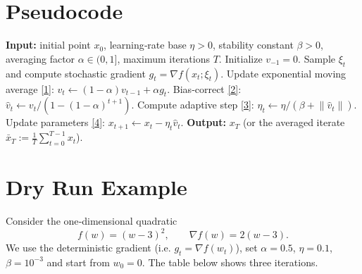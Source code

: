 \documentclass{article}
\newcommand{\norm}[1]{\left\|#1\right\|}
\newcommand{\grad}{\nabla}
\begin{document}
\section*{Pseudocode}
\begin{algorithm}[H]
\caption{Adaptive Variance‑Reduced Gradient (AVRG)}
\begin{algorithmic}[1]
\State \textbf{Input:} initial point $x_0$, learning‑rate base $\eta>0$, 
stability constant $\beta>0$, averaging factor $\alpha\in(0,1]$, 
maximum iterations $T$.
\State Initialize $v_{-1}=0$.
    \State Sample $\xi_t$ and compute stochastic gradient $g_t=\grad f(x_t;\xi_t)$.
    \State Update exponential moving average \eqref{1}:
          $v_t\gets (1-\alpha)v_{t-1}+ \alpha g_t$.
    \State Bias‑correct \eqref{2}:
          $\hat v_t\gets v_t/(1-(1-\alpha)^{t+1})$.
    \State Compute adaptive step \eqref{3}:
          $\eta_t\gets \eta/(\beta+\norm{\hat v_t})$.
    \State Update parameters \eqref{4}:
          $x_{t+1}\gets x_t-\eta_t\hat v_t$.
\EndFor
\State \textbf{Output:} $x_T$ (or the averaged iterate $\bar x_T:=\frac1T\sum_{t=0}^{T-1}x_t$).
\end{algorithmic}
\end{algorithm}

\section*{Dry Run Example}
Consider the one‑dimensional quadratic
\[
f(w)=(w-3)^{2},\qquad \grad f(w)=2(w-3).
\]
We use the deterministic gradient (i.e. $g_t=\grad f(w_t)$), set
$\alpha=0.5$, $\eta=0.1$, $\beta=10^{-3}$ and start from $w_0=0$.
The table below shows three iterations.
\end{document}
